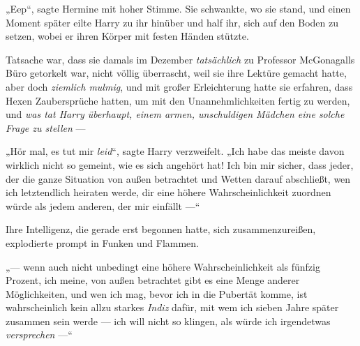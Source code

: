 „Eep“, sagte Hermine mit hoher Stimme. Sie schwankte, wo sie stand, und einen Moment später eilte Harry zu ihr hinüber und half ihr, sich auf den Boden zu setzen, wobei er ihren Körper mit festen Händen stützte.

Tatsache war, dass sie damals im Dezember \emph{tatsächlich} zu Professor McGonagalls Büro getorkelt war, nicht völlig überrascht, weil sie ihre Lektüre gemacht hatte, aber doch \emph{ziemlich mulmig}, und mit großer Erleichterung hatte sie erfahren, dass Hexen Zaubersprüche hatten, um mit den Unannehmlichkeiten fertig zu werden, und \emph{was tat Harry überhaupt, einem armen, unschuldigen Mädchen eine solche Frage zu stellen} —

„Hör mal, es tut mir \emph{leid}“, sagte Harry verzweifelt.
„Ich habe das meiste davon wirklich nicht so gemeint, wie es sich angehört hat! Ich bin mir sicher, dass jeder, der die ganze Situation von außen betrachtet und Wetten darauf abschließt, wen ich letztendlich heiraten werde, dir eine höhere Wahrscheinlichkeit zuordnen würde als jedem anderen, der mir einfällt —“

Ihre Intelligenz, die gerade erst begonnen hatte, sich zusammenzureißen, explodierte prompt in Funken und Flammen.

„— wenn auch nicht unbedingt eine höhere Wahrscheinlichkeit als fünfzig Prozent, ich meine, von außen betrachtet gibt es eine Menge anderer Möglichkeiten, und wen ich mag, bevor ich in die Pubertät komme, ist wahrscheinlich kein allzu starkes \emph{Indiz} dafür, mit wem ich sieben Jahre später zusammen sein werde — ich will nicht so klingen, als würde ich irgendetwas \emph{versprechen} —“


